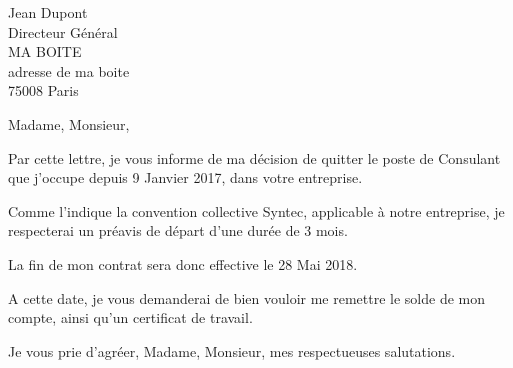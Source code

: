 \documentclass[12pt]{lettre}
\begin{document}
    \begin{letter}{Jean Dupont \\ Directeur Général \\ MA BOITE \\ adresse de ma boite \\ 75008 Paris}
        \date{le 28 Février 2018}
        \address{Jean Valjean \\ mon adresse \\ 91140 Villejust}
        \notelephone
        \nofax
        \def\concname{Objet :~}
        \opening{Madame, Monsieur,}
            Par cette lettre, je vous informe de ma décision de quitter le poste de Consulant que j’occupe depuis 9 Janvier 2017, dans votre entreprise.

            Comme l’indique la convention collective Syntec, applicable à notre entreprise, je respecterai un préavis de départ d’une durée de 3 mois.

            La fin de mon contrat sera donc effective le 28 Mai 2018.

            A cette date, je vous demanderai de bien vouloir me remettre le solde de mon compte, ainsi qu’un certificat de travail.

        \closing{Je vous prie d’agréer, Madame, Monsieur, mes respectueuses salutations.}
    \end{letter}
\end{document}
